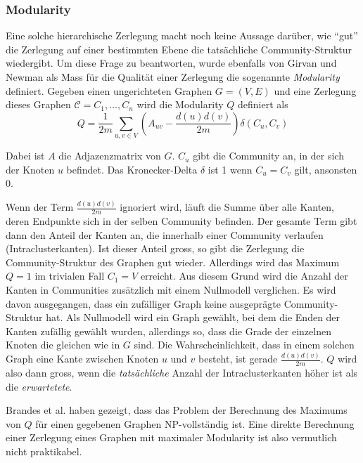 \subsubsection{Modularity}
\label{sec:modularity}

Eine solche hierarchische Zerlegung macht noch keine Aussage
dar\"uber, wie ``gut'' die Zerlegung auf einer bestimmten Ebene die
tats\"achliche Community-Struktur wiedergibt. Um diese Frage zu
beantworten, wurde ebenfalls von Girvan und Newman als Mass f\"ur die
Qualit\"at einer Zerlegung die sogenannte \emph{Modularity}
definiert\cite{Newman2004}. Gegeben einen ungerichteten Graphen $G=(V,
E)$ und eine Zerlegung dieses Graphen $\mathcal{C} = C_1, ..., C_n$
wird die Modularity $Q$ definiert als
\begin{equation}
  \label{eq:modularity}
  Q =
  \frac{1}{2m}\sum_{u, v \in
    V}\left(A_{uv}-\frac{d(u)d(v)}{2m}\right)\delta\left(C_u, C_v\right)
\end{equation}

Dabei ist $A$ die Adjazenzmatrix von $G$. $C_u$ gibt die Community an,
in der sich der Knoten $u$ befindet. Das Kronecker-Delta $\delta$
ist 1 wenn $C_u = C_v$ gilt, ansonsten 0.

Wenn der Term $\frac{d(u)d(v)}{2m}$ ignoriert wird, l\"auft die Summe
\"uber alle Kanten, deren Endpunkte sich in der selben Community
befinden. Der gesamte Term gibt dann den Anteil der Kanten an, die
innerhalb einer Community verlaufen (Intraclusterkanten). Ist dieser Anteil gross, so gibt
die Zerlegung die Community-Struktur des Graphen gut
wieder. Allerdings wird das Maximum $Q = 1$ im trivialen Fall $C_1 =
V$ erreicht. Aus diesem Grund wird die Anzahl der Kanten in
Communities zus\"atzlich mit einem Nullmodell verglichen. Es wird
davon ausgegangen, dass ein zuf\"alliger Graph keine ausgepr\"agte
Community-Struktur hat. Als Nullmodell wird ein Graph gew\"ahlt, bei
dem die Enden der Kanten zuf\"allig gew\"ahlt wurden, allerdings so,
dass die Grade der einzelnen Knoten die gleichen wie in $G$ sind.  Die
Wahrscheinlichkeit, dass in einem solchen Graph eine Kante zwischen
Knoten $u$ und $v$ besteht, ist gerade $\frac{d(u)d(v)}{2m}$. $Q$ wird
also dann gross, wenn die \emph{tats\"achliche} Anzahl der
Intraclusterkanten h\"oher ist als die \emph{erwartetete}.

Brandes et al. haben gezeigt, dass das Problem der Berechnung des
Maximums von $Q$ f\"ur einen gegebenen Graphen NP-vollst\"andig
ist\cite{DBLP:journals/tkde/BrandesDGGHNW08}. Eine direkte Berechnung
einer Zerlegung eines Graphen mit maximaler Modularity ist also
vermutlich nicht praktikabel.

